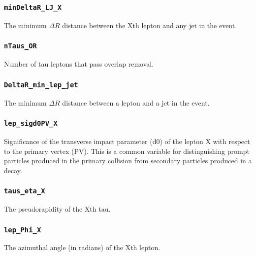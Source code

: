 
\subsubsection{\texttt{minDeltaR\_LJ\_X}} The minimum $\Delta R$ distance between the Xth lepton and any jet in the event.

\subsubsection{\texttt{nTaus\_OR}} Number of tau leptons that pass overlap removal.

\subsubsection{\texttt{DeltaR\_min\_lep\_jet}} The minimum $\Delta R$ distance between a lepton and a jet in the event.

\subsubsection{\texttt{lep\_sigd0PV\_X}} Significance of the transverse impact parameter (d0) of the lepton X with respect
to the primary vertex (PV). This is a common variable for distinguishing prompt particles produced in the primary
collision from secondary particles produced in a decay.

\subsubsection{\texttt{taus\_eta\_X}} The pseudorapidity of the Xth tau.

\subsubsection{\texttt{lep\_Phi\_X}} The azimuthal angle (in radians) of the Xth lepton.


